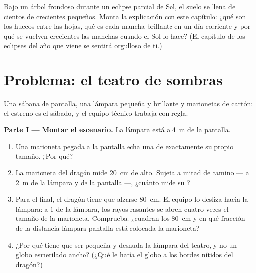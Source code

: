 \begin{exercise}[$\star\star\star$]\label{exo:g6:light-propagation:12}
Bajo un árbol frondoso durante un eclipse parcial de Sol, el suelo se
llena de cientos de crecientes pequeños. Monta la explicación con
este capítulo: ¿qué son los huecos entre las hojas, qué es cada mancha
brillante en un día corriente y por qué se vuelven crecientes las
manchas cuando el Sol lo hace? (El capítulo de los eclipses del año
que viene se sentirá orgulloso de ti.)
\end{exercise}

\section{Problema: el teatro de sombras}

\begin{problem}\label{pb:g6:light-propagation:1}
Una sábana de pantalla, una lámpara pequeña y brillante y marionetas
de cartón: el estreno es el sábado, y el equipo técnico trabaja con
regla.

\medskip\noindent\textbf{Parte I --- Montar el escenario.}
La lámpara está a \qty{4}{m} de la pantalla.
\begin{enumerate}
  \item Una marioneta pegada a la pantalla echa una  de
        exactamente su propio tamaño. ¿Por qué?
  \item La marioneta del dragón mide \qty{20}{cm} de alto. Sujeta a
        mitad de camino --- a \qty{2}{m} de la lámpara y de la
        pantalla ---, ¿cuánto mide su ?
  \item Para el final, el dragón tiene que alzarse \qty{80}{cm}. El
        equipo lo desliza hacia la lámpara: a $1$  de la
        lámpara, los rayos rasantes se abren cuatro veces el tamaño de
        la marioneta. Comprueba: ¿cuadran los \qty{80}{cm} y en qué
        fracción de la distancia lámpara-pantalla está colocada la
        marioneta?
  \item ¿Por qué tiene que ser pequeña y desnuda la lámpara del
        teatro, y no un globo esmerilado ancho? (¿Qué le haría el
        globo a los bordes nítidos del dragón?)
\end{enumerate}


\end{problem}
